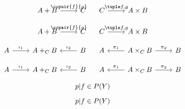 \documentclass{article}
\begin{document}
\begin{verbatim*}
\[
\begin{tikzcd}A+B\rar{\copair{f}{g}}&C\end{tikzcd}\quad
\begin{tikzcd}C\rar{\pair{f}{g}}&A\times B\end{tikzcd}
\]
\end{verbatim*}
%
\[
  \begin{tikzcd}A + B \rar{\copair{f}{g}} & C\end{tikzcd} \quad
  \begin{tikzcd}C \rar{\pair{f}{g}} & A \times B\end{tikzcd}
\]

\begin{verbatim*}
\[
\begin{tikzcd}A\rar{\inj_{1}}&\po{A}[C]{B}&\lar[swap]{\inj_{2}}B\end{tikzcd}\quad
\begin{tikzcd}A&\lar[swap]{\prj_{1}}\pb{A}[C]{B}\rar{\prj_{2}}&B\end{tikzcd}
\]
\end{verbatim*}
%
\[
  \begin{tikzcd}A \rar{\inj_{1}} & \po{A}[C]{B} & \lar[swap]{\inj_{2}} B\end{tikzcd} \quad
  \begin{tikzcd}A & \lar[swap]{\prj_{1}} \pb{A}[C]{B} \rar{\prj_{2}} & B\end{tikzcd}
\]

\begin{verbatim*}
\[\res[P][X]{p}[Y]{f}\in P(Y)\]
\end{verbatim*}
%
\[\res[P][X]{p}[Y]{f} \in P(Y)\]
\end{document}
